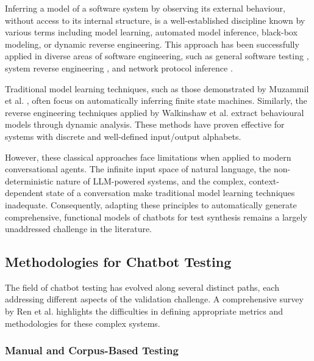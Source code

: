Inferring a model of a software system by observing its external behaviour,
without access to its internal structure,
is a well-established discipline known by various terms including
model learning, automated model inference, black-box modeling, or dynamic reverse engineering.
This approach has been successfully applied in diverse areas of software engineering,
such as general software testing \autocite{aichernigModelLearningModelBased2018},
system reverse engineering \autocite{hajipourIReEnReverseEngineeringBlackBox2021, menguyBlackboxCodeAnalysis2023},
and network protocol inference \autocite{luoDynPREProtocolReverse}.

Traditional model learning techniques,
such as those demonstrated by Muzammil et al. \autocite{shahbazAnalysisTestingBlackbox2014},
often focus on automatically inferring finite state machines.
Similarly, the reverse engineering techniques applied by Walkinshaw et al. \autocite{walkinshawReverseEngineeringSoftwareBehavior2013}
extract behavioural models through dynamic analysis.
These methods have proven effective for systems with discrete and well-defined input/output alphabets.

However, these classical approaches
face limitations when applied to modern conversational agents.
The infinite input space of natural language,
the non-deterministic nature of \ac{LLM}-powered systems,
and the complex, context-dependent state of a conversation
make traditional model learning techniques inadequate.
Consequently,
adapting these principles to automatically generate
comprehensive, functional models of chatbots for test synthesis
remains a largely unaddressed challenge in the literature.

\subsection{Methodologies for Chatbot Testing}

The field of chatbot testing has evolved along several distinct paths,
each addressing different aspects of the validation challenge.
A comprehensive survey by Ren et al. \autocite{renEvaluationTechniquesChatbot2019} highlights the difficulties
in defining appropriate metrics and methodologies for these complex systems.

\subsubsection{Manual and Corpus-Based Testing}

